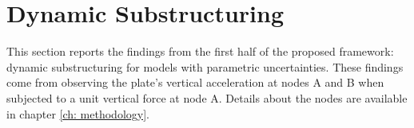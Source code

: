 %
%

\section{Dynamic Substructuring}
\label{sec: performance of cms}

This section reports the findings from the first half of the proposed framework: dynamic substructuring for models with parametric uncertainties. 
These findings come from observing the plate's vertical acceleration at nodes A and B when subjected to a unit vertical force at node A.
Details about the nodes are available in chapter \ref{ch: methodology}.


